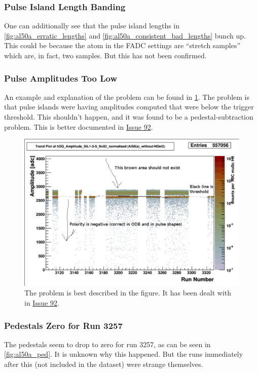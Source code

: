\documentclass[a4paper]{article}
\newcommand{\issue}[1]{\href{https://github.com/alcap-org/AlcapDAQ/issues/#1}{Issue #1}}
\begin{document}
\subsubsection{Pulse Island Length Banding}
\label{sec:al50a_tpi_length_bands}
One can additionally see that the pulse island lengths in \ref{fig:al50a_erratic_lengths} and \ref{fig:al50a_consistent_bad_lengths}
bunch up. This could be because the atom in the FADC settings are ``stretch samples'' which are, in fact, two samples.
But this has not been confirmed.

\subsubsection{Pulse Amplitudes Too Low}
\label{sec:al50a_tpi_amp}
An example and explanation of the problem can be found in \ref{fig:al50a_amp_below_thresh}. The problem is that pulse islands
were having amplitudes computed that were below the trigger threshold. This shouldn't happen, and it was found to be
a pedestal-subtraction problem. This is better documented in \issue{92}.

\begin{figure}
  \centering
  \includegraphics[width=0.9\linewidth]{figs/al50a/amplitude_too_low}
  \caption{The problem is best described in the figure. It has been dealt with in \issue{92}.}
  \label{fig:al50a_amp_below_thresh}
\end{figure}


\subsubsection{Pedestals Zero for Run 3257}
\label{sec:al50a_ped_zero}
The pedestals seem to drop to zero for run 3257, as can be seen in \ref{fig:al50a_ped}. It is unknown
why this happened. But the runs immediately after this (not included in the dataset) were strange themselves.
\end{document}
